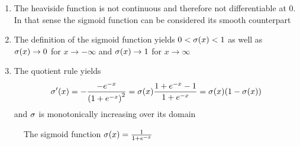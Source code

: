 \begin{remarks}
    \hfill
    \begin{enumerate}
        \item The heaviside function is not continuous and therefore not differentiable at \( 0 \).
              In that sense the sigmoid function can be considered its smooth counterpart
        \item The definition of the sigmoid function yields \( 0 < \sigma(x) < 1 \) as well as
              \( \sigma(x) \to 0 \) for \( x \to -\infty \) and \( \sigma(x) \to 1 \)
              for \( x \to \infty \)
        \item The quotient rule yields
              \[
                  \sigma'(x)
                  = -\frac{-e^{-x}}{{(1 + e^{-x})}^2}
                  = \sigma(x) \frac{1 + e^{-x} - 1}{1 + e^{-x}}
                  = \sigma(x)(1 - \sigma(x))
              \]
              and \( \sigma \) is monotonically increasing over its domain
    \end{enumerate}
\end{remarks}
\bigskip


\begin{figure}[H]
    \centering
    \plotsigmoid{}
    \caption{The sigmoid function \( \sigma(x) = \frac{1}{1 + e^{-x}} \)}\label{fig:sigmoid}
\end{figure}
\bigskip

